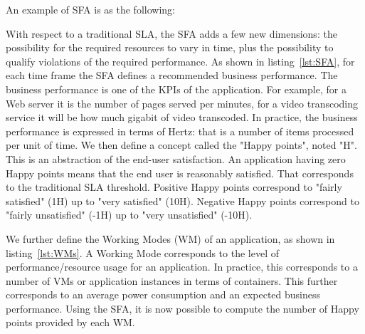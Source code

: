 An example of SFA is as the following:

With respect to a traditional SLA, the SFA adds a few new dimensions: the possibility for the required resources to vary in time, plus the possibility to qualify violations of the required performance.
As shown in listing~\ref{lst:SFA}, for each time frame the SFA defines a recommended business performance. 
The business performance is one of the KPIs of the application.
For example, for a Web server it is the number of pages served per minutes, for a video transcoding service it will be how much gigabit of video transcoded.
In practice, the business performance is expressed in terms of Hertz: that is a number of items processed per unit of time.
We then define a concept called the "Happy points", noted "H".
This is an abstraction of the end-user satisfaction.
An application having zero Happy points means that the end user is reasonably satisfied.
That corresponds to the traditional SLA threshold.
Positive Happy points correspond to "fairly satisfied" (1H) up to "very satisfied" (10H).
Negative Happy points correspond to "fairly unsatisfied" (-1H) up to "very unsatisfied" (-10H).


We further define the Working Modes (WM) of an application, as shown in listing~\ref{lst:WMs}.
A Working Mode corresponds to the level of performance/resource usage for an application.
In practice, this corresponds to a number of VMs or application instances in terms of containers.
This further corresponds to an average power consumption and an expected business performance. 
Using the SFA, it is now possible to compute the number of Happy points provided by each WM.

